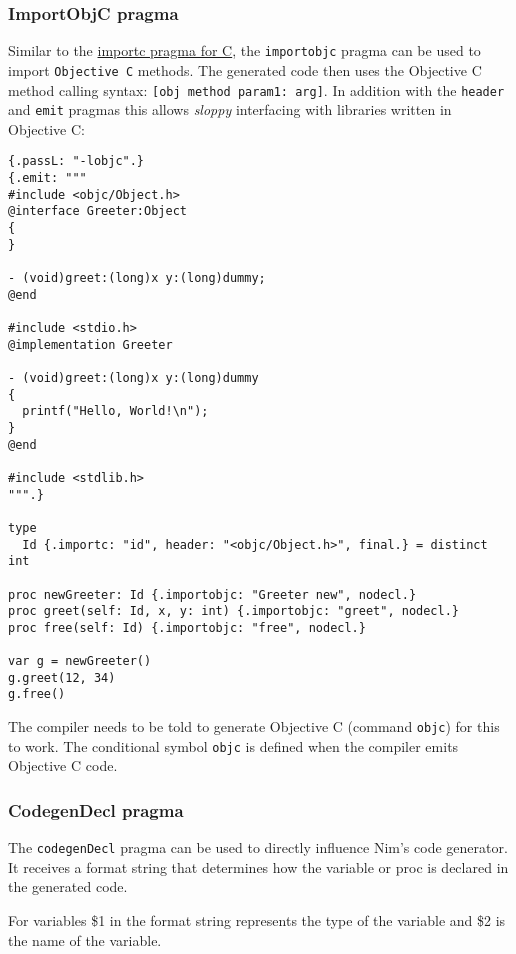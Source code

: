 \hypertarget{importobjc-pragma}{%
\subsubsection{ImportObjC pragma}\label{importobjc-pragma}}

Similar to the
\protect\hyperlink{foreign-function-interface-importc-pragma}{importc
pragma for C}, the \texttt{importobjc} pragma can be used to import
\texttt{Objective\ C} methods. The generated code then uses the
Objective C method calling syntax:
\texttt{{[}obj\ method\ param1:\ arg{]}}. In addition with the
\texttt{header} and \texttt{emit} pragmas this allows \emph{sloppy}
interfacing with libraries written in Objective C:

\begin{verbatim}
{.passL: "-lobjc".}
{.emit: """
#include <objc/Object.h>
@interface Greeter:Object
{
}

- (void)greet:(long)x y:(long)dummy;
@end

#include <stdio.h>
@implementation Greeter

- (void)greet:(long)x y:(long)dummy
{
  printf("Hello, World!\n");
}
@end

#include <stdlib.h>
""".}

type
  Id {.importc: "id", header: "<objc/Object.h>", final.} = distinct int

proc newGreeter: Id {.importobjc: "Greeter new", nodecl.}
proc greet(self: Id, x, y: int) {.importobjc: "greet", nodecl.}
proc free(self: Id) {.importobjc: "free", nodecl.}

var g = newGreeter()
g.greet(12, 34)
g.free()
\end{verbatim}

The compiler needs to be told to generate Objective C (command
\texttt{objc}) for this to work. The conditional symbol \texttt{objc} is
defined when the compiler emits Objective C code.

\hypertarget{codegendecl-pragma}{%
\subsubsection{CodegenDecl pragma}\label{codegendecl-pragma}}

The \texttt{codegenDecl} pragma can be used to directly influence Nim's
code generator. It receives a format string that determines how the
variable or proc is declared in the generated code.

For variables \$1 in the format string represents the type of the
variable and \$2 is the name of the variable.

